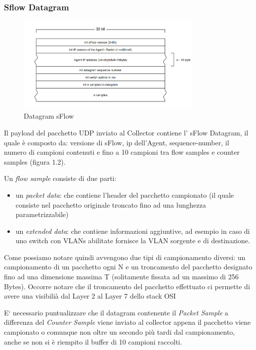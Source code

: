 \documentclass[12pt,a4paper,openright,twoside]{report}
\begin{document}
\newpage

\subsubsection{Sflow Datagram}

\begin{figure}[t!]
  \begin{center}                          %
    \includegraphics[width=90mm]{images/sflow-datagram.png}
    \caption{Datagram sFlow}
    \label{Datagram sFlow}
  \end{center}
\end{figure}

Il payload del pacchetto UDP inviato al Collector contiene l' sFlow Datagram, il quale
\`e composto da: versione di sFlow, ip dell'Agent, sequence-number, il numero di campioni
contenuti e fino a 10 campioni tra flow samples e counter samples (figura 1.2).

Un {\it flow sample} consiste di due parti:
\begin{itemize}
  \item un {\it packet data}: che contiene l'header del pacchetto campionato (il
  quale consiste nel pacchetto originale troncato fino ad una lunghezza parametrizzabile)
  \item un {\it extended data}: che contiene informazioni aggiuntive, ad esempio in
  caso di uno switch con VLANs abilitate fornisce la VLAN sorgente e di destinazione.
\end{itemize}

Come possiamo notare quindi avvengono due tipi di campionamento diversi: un campionamento
di un pacchetto ogni N e un troncamento del pacchetto designato fino ad una dimensione massima
T (solitamente fissata ad un massimo di 256 Bytes).
Occorre notare che il troncamento del pacchetto effettuato ci permette di avere
una visibili\`a dal Layer 2 al Layer 7 dello stack OSI \cite{B1}

E` necessario puntualizzare che il datagram contenente il {\it Packet Sample} a differenza del {\it Counter Sample}
viene inviato al collector appena il pacchetto viene campionato o comunque non oltre
un secondo pi\`u tardi dal campionamento, anche se non si \`e riempito il buffer di
10 campioni raccolti.
\end{document}

